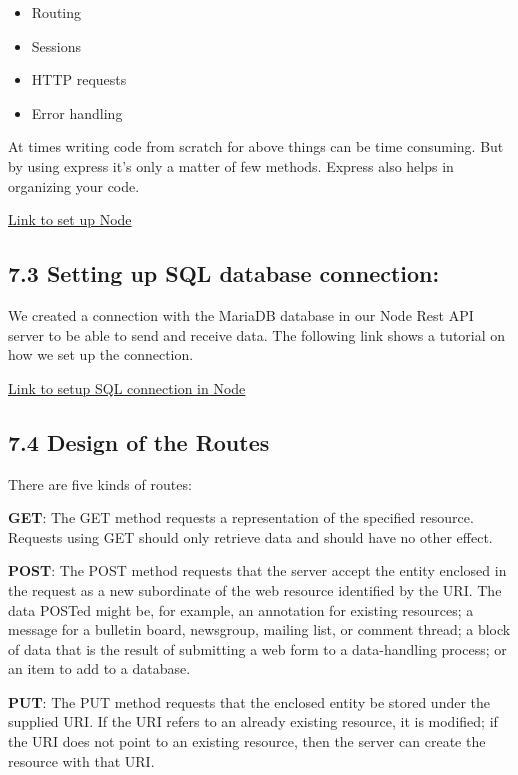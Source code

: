 \documentclass[]{book}
\providecommand{\tightlist}{%
  \setlength{\itemsep}{0pt}\setlength{\parskip}{0pt}}
\begin{document}
\begin{itemize}
\tightlist
\item
  Routing
\item
  Sessions
\item
  HTTP requests
\item
  Error handling
\end{itemize}

At times writing code from scratch for above things can be time
consuming. But by using express it's only a matter of few methods.
Express also helps in organizing your code.

\href{https://medium.com/@onejohi/building-a-simple-rest-api-with-nodejs-and-express-da6273ed7ca9}{Link
to set up Node}

\subsection{7.3 Setting up SQL database
connection:}\label{setting-up-sql-database-connection-1}

We created a connection with the MariaDB database in our Node Rest API
server to be able to send and receive data. The following link shows a
tutorial on how we set up the connection.

\href{https://bezkoder.com/node-js-rest-api-express-mysql/}{Link to
setup SQL connection in Node}

\subsection{7.4 Design of the Routes}\label{design-of-the-routes-1}

There are five kinds of routes:

\textbf{GET}: The GET method requests a representation of the specified
resource. Requests using GET should only retrieve data and should have
no other effect.

\textbf{POST}: The POST method requests that the server accept the
entity enclosed in the request as a new subordinate of the web resource
identified by the URI. The data POSTed might be, for example, an
annotation for existing resources; a message for a bulletin board,
newsgroup, mailing list, or comment thread; a block of data that is the
result of submitting a web form to a data-handling process; or an item
to add to a database.

\textbf{PUT}: The PUT method requests that the enclosed entity be stored
under the supplied URI. If the URI refers to an already existing
resource, it is modified; if the URI does not point to an existing
resource, then the server can create the resource with that URI.
\end{document}
